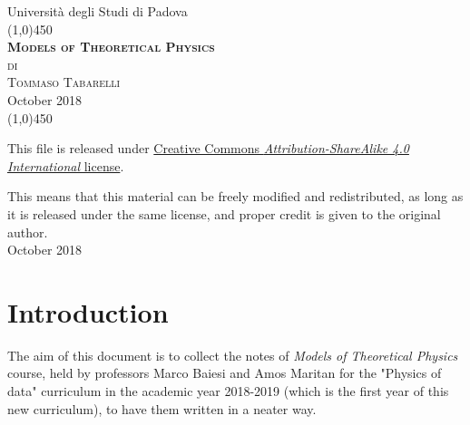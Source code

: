 \documentclass[12pt, english, a4paper]{book}
\begin{document}
\begin{titlepage}

\begin{center}
\LARGE{Università degli Studi di Padova}\\
\line(1,0){450}\\
\vspace{10em}
\Huge{\textsc{\textbf{Models of Theoretical Physics}}}\\
\vspace{4em}
\LARGE{\textsc{di}}\\
\vspace{3em}
\huge{\textsc{Tommaso Tabarelli}}\\
\vspace{10em}
\LARGE{October 2018}\\
\line(1,0){450}
\end{center}

\end{titlepage}
\let\cleardoublepage\clearpage

\thispagestyle{empty}
\null
\vfill
\begin{center}
\small{This file is released under \href{http://creativecommons.org/licenses/by-sa/4.0/}{\color{blue}Creative Commons \emph{Attribution-ShareAlike 4.0 International} license}.}
\begin{figure}[H]
\centering
\end{figure}
\vspace{0.5em}
This means that this material can be freely modified and redistributed, as long as it is released under the same license, and proper credit is given to the original author.\\

\vspace{2em}
\scriptsize{October 2018}
\end{center}

\newpage
\thispagestyle{empty}
\chapter*{Introduction}
The aim of this document is to collect the notes of \textit{Models of Theoretical Physics} course, held by professors Marco Baiesi and Amos Maritan for the "Physics of data" curriculum in the academic year 2018-2019 (which is the first year of this new curriculum), to have them written in a neater way.
\end{document}

